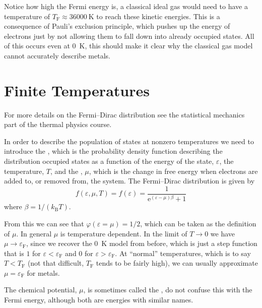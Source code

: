 \documentclass[fleqn]{NotesClass}
\newcommand*{\boltzmann}{k_{\mathrm{B}}}
\newcommand*{\e}{\mathrm{e}}
\newcommand*{\fermi}{\mathrm{F}}
\begin{document}
    Notice how high the Fermi energy is, a classical ideal gas would need to have a temperature of \(T_{\fermi} \approx \qty{36000}{\kelvin}\) to reach these kinetic energies.
    This is a consequence of Pauli's exclusion principle, which pushes up the energy of electrons just by not allowing them to fall down into already occupied states.
    All of this occurs even at \qty{0}{\kelvin}, this should make it clear why the classical gas model cannot accurately describe metals.
    
    \section{Finite Temperatures}
    \begin{rmk}
        For more details on the Fermi--Dirac distribution see the statistical mechanics part of the thermal physics course.
    \end{rmk}
    In order to describe the population of states at nonzero temperatures we need to introduce the , which is the probability density function describing the distribution occupied states as a function of the energy of the state, \(\varepsilon\), the temperature, \(T\), and the , \(\mu\), which is the change in free energy when electrons are added to, or removed from, the system.
    The Fermi--Dirac distribution is given by
    \begin{equation}
        f(\varepsilon, \mu, T) = f(\varepsilon) = \frac{1}{\e^{(\varepsilon - \mu)\beta} + 1}
    \end{equation}
    where \(\beta = 1/(\boltzmann T)\).
    
    From this we can see that \(\varphi(\varepsilon = \mu) = 1/2\), which can be taken as the definition of \(\mu\).
    In general \(\mu\) is temperature dependent.
    In the limit of \(T \to 0\) we have \(\mu \to \varepsilon_{\fermi}\), since we recover the \qty{0}{\kelvin} model from before, which is just a step function that is \(1\) for \(\varepsilon < \varepsilon_{\fermi}\) and \(0\) for \(\varepsilon > \varepsilon_{\fermi}\).
    At \enquote{normal} temperatures, which is to say \(T < T_{\fermi}\) (not that difficult, \(T_{\fermi}\) tends to be fairly high), we can usually approximate \(\mu = \varepsilon_{\fermi}\) for metals.
    
    \begin{wrn}
        The chemical potential, \(\mu\), is sometimes called the , do not confuse this with the Fermi energy, although both are energies with similar names.
    \end{wrn}
    
\end{document}
